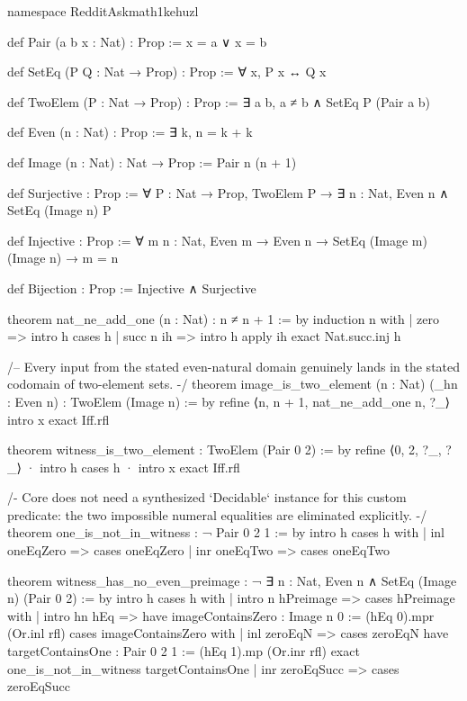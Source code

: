 \documentclass[11pt]{article}
\begin{document}
\begin{Vlean}
namespace RedditAskmath1kehuzl

def Pair (a b x : Nat) : Prop :=
  x = a ∨ x = b

def SetEq (P Q : Nat → Prop) : Prop :=
  ∀ x, P x ↔ Q x

def TwoElem (P : Nat → Prop) : Prop :=
  ∃ a b, a ≠ b ∧ SetEq P (Pair a b)

def Even (n : Nat) : Prop :=
  ∃ k, n = k + k

def Image (n : Nat) : Nat → Prop :=
  Pair n (n + 1)

def Surjective : Prop :=
  ∀ P : Nat → Prop, TwoElem P →
    ∃ n : Nat, Even n ∧ SetEq (Image n) P

def Injective : Prop :=
  ∀ m n : Nat, Even m → Even n →
    SetEq (Image m) (Image n) → m = n

def Bijection : Prop :=
  Injective ∧ Surjective

theorem nat_ne_add_one (n : Nat) : n ≠ n + 1 := by
  induction n with
  | zero =>
      intro h
      cases h
  | succ n ih =>
      intro h
      apply ih
      exact Nat.succ.inj h

/-- Every input from the stated even-natural domain genuinely lands in the
stated codomain of two-element sets. -/
theorem image_is_two_element (n : Nat) (_hn : Even n) :
    TwoElem (Image n) := by
  refine ⟨n, n + 1, nat_ne_add_one n, ?_⟩
  intro x
  exact Iff.rfl

theorem witness_is_two_element : TwoElem (Pair 0 2) := by
  refine ⟨0, 2, ?_, ?_⟩
  · intro h
    cases h
  · intro x
    exact Iff.rfl

/- Core does not need a synthesized `Decidable` instance for this custom
predicate: the two impossible numeral equalities are eliminated explicitly. -/
theorem one_is_not_in_witness : ¬ Pair 0 2 1 := by
  intro h
  cases h with
  | inl oneEqZero =>
      cases oneEqZero
  | inr oneEqTwo =>
      cases oneEqTwo

theorem witness_has_no_even_preimage :
    ¬ ∃ n : Nat, Even n ∧ SetEq (Image n) (Pair 0 2) := by
  intro h
  cases h with
  | intro n hPreimage =>
      cases hPreimage with
      | intro hn hEq =>
          have imageContainsZero : Image n 0 :=
            (hEq 0).mpr (Or.inl rfl)
          cases imageContainsZero with
          | inl zeroEqN =>
              cases zeroEqN
              have targetContainsOne : Pair 0 2 1 :=
                (hEq 1).mp (Or.inr rfl)
              exact one_is_not_in_witness targetContainsOne
          | inr zeroEqSucc =>
              cases zeroEqSucc


\end{Vlean}
\end{document}

